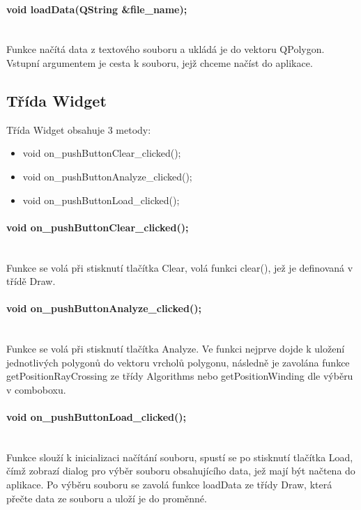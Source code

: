 \documentclass[11pt]{article}
\begin{document}
\paragraph{void loadData(QString \&file\_name);}\mbox{}\\
Funkce načítá data z textového souboru a ukládá je do vektoru QPolygon. Vstupní argumentem je cesta k souboru, jejž chceme načíst do aplikace.   

\subsection{Třída Widget}
Třída Widget obsahuje 3 metody:

\begin{itemize}
\item void on\_pushButtonClear\_clicked();
\item void on\_pushButtonAnalyze\_clicked();
\item void on\_pushButtonLoad\_clicked();
\end{itemize}

\paragraph{ void on\_pushButtonClear\_clicked();}\mbox{}\\
Funkce se volá při stisknutí tlačítka Clear, volá funkci clear(), jež je definovaná v třídě Draw.

\paragraph{ void on\_pushButtonAnalyze\_clicked();}\mbox{}\\
Funkce se volá při stisknutí tlačítka Analyze. Ve funkci nejprve dojde k uložení jednotlivých polygonů do vektoru vrcholů polygonu, následně je zavolána funkce getPositionRayCrossing ze třídy Algorithms nebo getPositionWinding dle výběru v comboboxu.

\paragraph{void on\_pushButtonLoad\_clicked();}\mbox{}\\
Funkce slouží k inicializaci načítání souboru, spustí se po stisknutí tlačítka Load, čímž zobrazí dialog pro výběr souboru obsahujícího data, jež mají být načtena do aplikace. Po výběru souboru se zavolá funkce loadData ze třídy Draw, která přečte data ze souboru a uloží je do proměnné.
\end{document}
